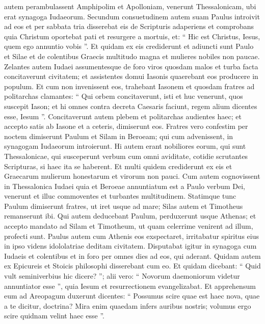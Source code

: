 \begin{biblechapter}
\begin{biblechapter}
\begin{biblechapter}
\begin{biblechapter}
\begin{biblechapter}
\begin{biblechapter}
\begin{biblechapter}
\begin{biblechapter}
\begin{biblechapter}
\begin{biblechapter}
\begin{biblechapter}
\begin{biblechapter}
\begin{biblechapter}
\begin{biblechapter}
\begin{biblechapter}
\begin{biblechapter}
\begin{biblechapter}
 \verseCum autem perambulassent Amphipolim et Apolloniam, venerunt Thessalonicam, ubi erat synagoga Iudaeorum. 
\verse Secundum consuetudinem autem suam Paulus introivit ad eos et per sabbata tria disserebat eis de Scripturis 
\verse adaperiens et comprobans quia Christum oportebat pati et resurgere a mortuis, et: “ Hic est Christus, Iesus, quem ego annuntio vobis ”. 
\verse Et quidam ex eis crediderunt et adiuncti sunt Paulo et Silae et de colentibus Graecis multitudo magna et mulieres nobiles non paucae. 
\verse Zelantes autem Iudaei assumentesque de foro viros quosdam malos et turba facta concitaverunt civitatem; et assistentes domui Iasonis quaerebant eos producere in populum. 
\verse Et cum non invenissent eos, trahebant Iasonem et quosdam fratres ad politarchas clamantes: “ Qui orbem concitaverunt, isti et huc venerunt, 
\verse quos suscepit Iason; et hi omnes contra decreta Caesaris faciunt, regem alium dicentes esse, Iesum ”. 
 \verse Concitaverunt autem plebem et politarchas audientes haec; 
\verse et accepto satis ab Iasone et a ceteris, dimiserunt eos.
 \verse Fratres vero confestim per noctem dimiserunt Paulum et Silam in Beroeam; qui cum advenissent, in synagogam Iudaeorum introierunt. 
\verse Hi autem erant nobiliores eorum, qui sunt Thessalonicae, qui susceperunt verbum cum omni aviditate, cotidie scrutantes Scripturas, si haec ita se haberent. 
\verse Et multi quidem crediderunt ex eis et Graecarum mulierum honestarum et virorum non pauci. 
\verse Cum autem cognovissent in Thessalonica Iudaei quia et Beroeae annuntiatum est a Paulo verbum Dei, venerunt et illuc commoventes et turbantes multitudinem. 
 \verse Statimque tunc Paulum dimiserunt fratres, ut iret usque ad mare; Silas autem et Timotheus remanserunt ibi. 
\verse Qui autem deducebant Paulum, perduxerunt usque Athenas; et accepto mandato ad Silam et Timotheum, ut quam celerrime venirent ad illum, profecti sunt.
 \verse Paulus autem cum Athenis eos exspectaret, irritabatur spiritus eius in ipso videns idololatriae deditam civitatem. 
\verse Disputabat igitur in synagoga cum Iudaeis et colentibus et in foro per omnes dies ad eos, qui aderant. 
\verse Quidam autem ex Epicureis et Stoicis philosophi disserebant cum eo. Et quidam dicebant: “ Quid vult seminiverbius hic dicere? ”; alii vero: “ Novorum daemoniorum videtur annuntiator esse ”, quia Iesum et resurrectionem evangelizabat. 
\verse Et apprehensum eum ad Areopagum duxerunt dicentes: “ Possumus scire quae est haec nova, quae a te dicitur, doctrina? 
\verse Mira enim quaedam infers auribus nostris; volumus ergo scire quidnam velint haec esse ”. 

\end{biblechapter}
\end{biblechapter}
\end{biblechapter}
\end{biblechapter}
\end{biblechapter}
\end{biblechapter}
\end{biblechapter}
\end{biblechapter}
\end{biblechapter}
\end{biblechapter}
\end{biblechapter}
\end{biblechapter}
\end{biblechapter}
\end{biblechapter}
\end{biblechapter}
\end{biblechapter}
\end{biblechapter}
